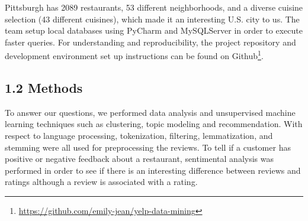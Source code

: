 \documentclass{neu_handout}
\begin{document}
\begin{figure}[h]
\centering
{}
\end{figure}

Pittsburgh has 2089 restaurants, 53 different neighborhoods, and a diverse cuisine selection (43 different cuisines), which made it an interesting U.S. city to us.
The team setup local databases using PyCharm and MySQLServer in order to execute faster queries. For understanding and reproducibility, the project repository and development environment set up instructions can be found on Github\footnote{\url{https://github.com/emily-jean/yelp-data-mining}}.

\subsection*{1.2 Methods}
To answer our questions, we performed data analysis and unsupervised machine learning techniques such as clustering, topic modeling and recommendation. With respect to language processing, tokenization, filtering, lemmatization, and stemming were all used for preprocessing the reviews. To tell if a customer has positive or negative feedback about a restaurant, sentimental analysis was performed in order to see if there is an interesting difference between reviews and ratings although a review is associated with a rating.
\end{document}
